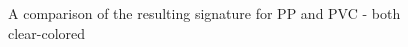 \begin{figure}[H]
  \begin{minipage}{\wd\FigBox}
    \centering\usebox{\FigBox}
  \end{minipage}
  \caption{A comparison of the resulting signature for PP and PVC - both clear-colored}
  \label{fig:plastcomp1}
\end{figure}

